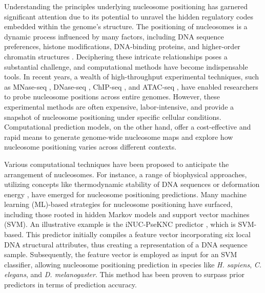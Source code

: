 \documentclass[a4paper,fleqn]{cas-dc}
\begin{document}
Understanding the principles underlying nucleosome positioning has garnered significant attention due to its potential to unravel the hidden regulatory codes embedded within the genome's structure. The positioning of nucleosomes is a dynamic process influenced by many factors, including DNA sequence preferences, histone modifications, DNA-binding proteins, and higher-order chromatin structures \cite{Struhl2013, Segal2009}. Deciphering these intricate relationships poses a substantial challenge, and computational methods have become indispensable tools. In recent years, a wealth of high-throughput experimental techniques, such as MNase-seq \cite{Kaplan2008, Jiang2009}, DNase-seq \cite{Bell2011,Zhong2016}, ChIP-seq \cite{Schones2008}, and ATAC-seq \cite{Schep2015}, have enabled researchers to probe nucleosome positions across entire genomes. However, these experimental methods are often expensive, labor-intensive, and provide a snapshot of nucleosome positioning under specific cellular conditions. Computational prediction models, on the other hand, offer a cost-effective and rapid means to generate genome-wide nucleosome maps and explore how nucleosome positioning varies across different contexts.

Various computational techniques have been proposed to anticipate the arrangement of nucleosomes. For instance, a range of biophysical approaches, utilizing concepts like thermodynamic stability of DNA sequences \cite{Scipioni2009} or deformation energy \cite{Chen2016}, have emerged for nucleosome positioning predictions. Many machine learning (ML)-based strategies for nucleosome positioning have surfaced, including those rooted in hidden Markov models \cite{Xi2010} and support vector machines (SVM). An illustrative example is the iNUC-PseKNC predictor \cite{Guo2014}, which is SVM-based. This predictor initially compiles a feature vector incorporating six local DNA structural attributes, thus creating a representation of a DNA sequence sample. Subsequently, the feature vector is employed as input for an SVM classifier, allowing nucleosome positioning prediction in species like \textit{H. sapiens}, \textit{C. elegans}, and \textit{D. melanogaster}. This method has been proven to surpass prior predictors in terms of prediction accuracy.
\end{document}
